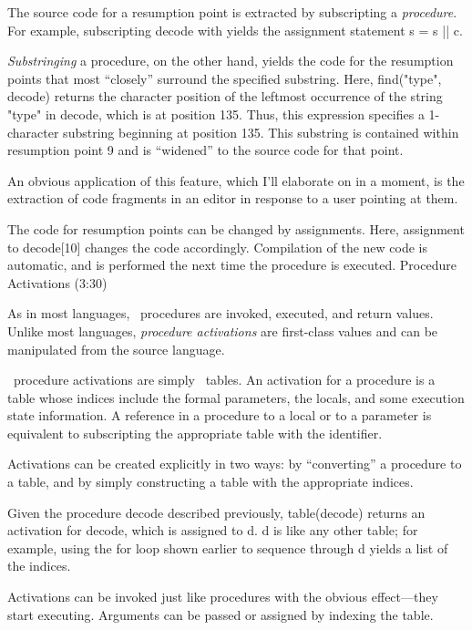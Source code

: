 The source code for a resumption point is extracted by
subscripting a {\sl procedure}.
For example, subscripting {\pt decode \rm with }
yields the assignment statement {\pt s = s || c}.

{\sl Substringing\/} a procedure, on the other hand,
yields the code for the resumption points that most
``closely'' surround the specified substring.
Here, {\pt find("type", decode)} returns the character
position of the leftmost occurrence of the
string {\pt "type" \rm in \pt decode}, which is at position 135.
Thus, this expression specifies a 1-character substring beginning
at position 135.
This substring is contained within resumption point 9
and is ``widened'' to the source code for that point.

An obvious application of this feature, which I'll elaborate
on in a moment, is the extraction of code fragments in an editor in response
to a user pointing at them.

The code for resumption points can be changed by assignments.
Here, assignment to {\pt decode[10]} changes the code accordingly.
Compilation of the new code is automatic, and is performed
the next time the procedure is executed.
\NewPage
\beginsection Procedure Activations (3:30)

As in most languages, \EZ\ procedures are invoked, executed,
and return values.
Unlike most languages, {\sl procedure activations} are first-class
values and can be manipulated from the source language.

\EZ\ procedure activations are simply \EZ\ tables.
An activation for a procedure is a table
whose indices include the formal parameters, the locals,
and some execution state information.
A reference in a procedure to a local or to a parameter
is equivalent to subscripting the appropriate table with the identifier.

Activations can be created explicitly in two ways:
by ``converting'' a procedure to a table, and by simply
constructing a table with the appropriate indices.

Given the procedure {\pt decode} described previously,
{\pt table(decode)} returns an activation for {\pt decode}, which
is assigned to {\pt d}.
{\pt d} is like any other table; for example,
using the {\pt for} loop shown earlier to sequence through {\pt d}
yields a list of the indices.

Activations can be invoked just like procedures
with the obvious effect---they start executing.
Arguments can be passed or assigned by indexing the table.

